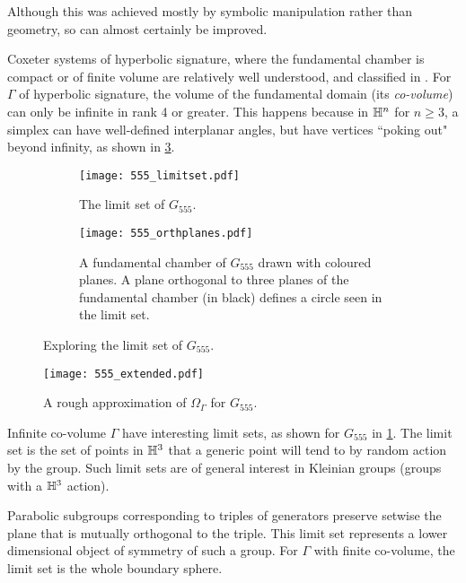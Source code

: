 Although this was achieved mostly by symbolic manipulation rather than geometry, so can almost certainly be improved.

Coxeter systems of hyperbolic signature, where the fundamental chamber is compact or of finite volume are relatively well understood, and classified in \cite[Section 6.9]{humphreys_reflection_1990}.
For $\Gamma$ of hyperbolic signature, the volume of the fundamental domain (its \emph{co-volume}) can only be infinite in rank 4 or greater.
This happens because in  $\mathbb{H}^n$ for  $n\geq 3$, a simplex can have well-defined interplanar angles, but have vertices ``poking out" beyond infinity, as shown in \cref{fig:555_orthogonal_planes}.

\begin{figure}[ht]
	\centering
	\begin{subfigure}[t]{.45\textwidth}
		\centering
		\texttt{[image: 555\_limitset.pdf]}
		\caption{The limit set of $G_{555}$.}
		\label{fig:555_limitset}
	\end{subfigure}
	\hspace{0.2ex}
	\begin{subfigure}[t]{.45\textwidth}
		\centering
		\texttt{[image: 555\_orthplanes.pdf]}
		\caption{A fundamental chamber of $G_{555}$ drawn with coloured planes.
			A plane orthogonal to three planes of the fundamental chamber (in black) defines a circle seen in the limit set.}
		\label{fig:555_orthogonal_planes}
	\end{subfigure}%
	\caption{Exploring the limit set of $G_{555}$.}
\end{figure}

\begin{figure}[ht]
	\centering
	\texttt{[image: 555\_extended.pdf]}
	\caption{A rough approximation of $\Omega_\Gamma$ for $G_{555}$.}
	\label{fig:555_exteded_space}
\end{figure}

Infinite co-volume $\Gamma$ have interesting limit sets, as shown for $G_{555}$ in \cref{fig:555_limitset}.
The limit set is the set of points in $\mathbb{H}^3$ that a generic point will tend to by random action by the group.
Such limit sets are of general interest in Kleinian groups (groups with a $\mathbb{H}^3$ action).

Parabolic subgroups corresponding to triples of generators preserve setwise the plane that is mutually orthogonal to the triple.
This limit set represents a lower dimensional object of symmetry of such a group.
For $\Gamma$ with finite co-volume, the limit set is the whole boundary sphere.

